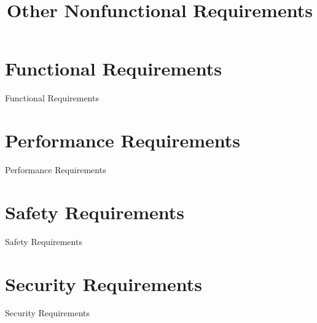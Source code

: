 \documentclass{article}
\begin{document}
\begin{CJK}{UTF8}{bkai}
\section*{ Functional Requirements}
 Functional Requirements
\newpage


\title{\huge\bf Other Nonfunctional Requirements }
\section*{ Performance Requirements}
 Performance Requirements
\section*{Safety Requirements }
Safety Requirements
\section*{ Security Requirements }
 Security Requirements
\newpage


\end{CJK}
\end{document}

